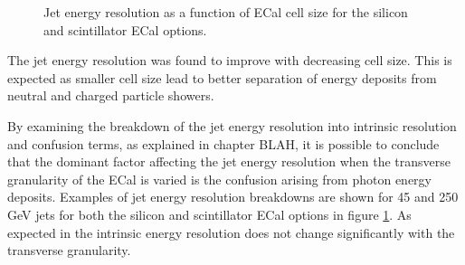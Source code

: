 \begin{figure}
\centering
{}
 \hfill
\caption[Jet energy resolution as a function of ECal cell size.]{Jet energy resolution as a function of ECal cell size for the silicon and scintillator ECal options.}
\label{fig:ecalcellsize}
\end{figure}

The jet energy resolution was found to improve with decreasing cell size.  This is expected as smaller cell size lead to better separation of energy deposits from neutral and charged particle showers.  

By examining the breakdown of the jet energy resolution into intrinsic resolution and confusion terms, as explained in chapter BLAH, it is possible to conclude that the dominant factor affecting the jet energy resolution when the transverse granularity of the ECal is varied is the confusion arising from photon energy deposits.  Examples of jet energy resolution breakdowns are shown for 45 and 250 GeV jets for both the silicon and scintillator ECal options in figure \ref{fig:ecalcellsize}.  As expected in the intrinsic energy resolution does not change significantly with the transverse granularity.  


